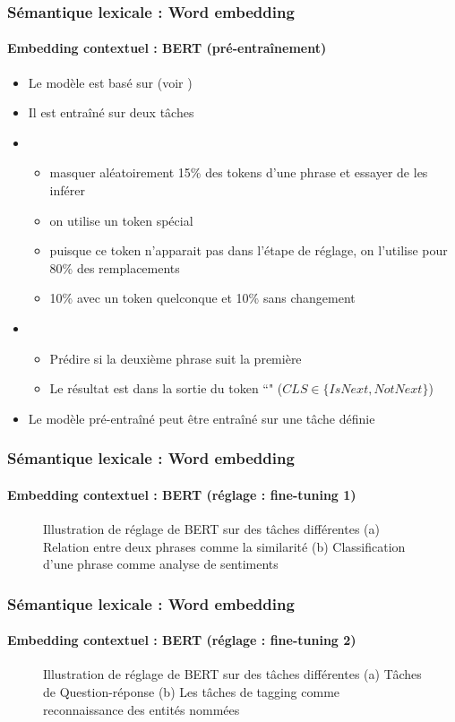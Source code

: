 \documentclass[xcolor=table]{beamer}
\begin{document}
\begin{frame}
\frametitle{Sémantique lexicale : Word embedding}
\framesubtitle{Embedding contextuel : BERT (pré-entraînement)}
	
\begin{itemize}
	\item Le modèle est basé sur  (voir \cite{2017-vaswani-al})
	\item Il est entraîné sur deux tâches
	\item {}
	\begin{itemize}
		\item masquer aléatoirement 15\% des tokens d'une phrase et essayer de les inférer
		\item on utilise un token spécial \keyword{[MASK]}
		\item puisque ce token n'apparait pas dans l'étape de réglage, on l'utilise pour 80\% des remplacements
		\item 10\% avec un token quelconque et 10\% sans changement 
	\end{itemize}
	\item {}
	\begin{itemize}
		\item Prédire si la deuxième phrase suit la première 
		\item Le résultat est dans la sortie du token ``\keyword{[CLS]}" ($CLS \in \{IsNext, NotNext\}$)
	\end{itemize}
	\item Le modèle pré-entraîné peut être entraîné sur une tâche définie
\end{itemize}
	
\end{frame}

\begin{frame}
\frametitle{Sémantique lexicale : Word embedding}
\framesubtitle{Embedding contextuel : BERT (réglage : fine-tuning 1)}

	\begin{figure}
		\caption{Illustration de réglage de BERT sur des tâches différentes \cite{2019-devlin-al}
		(a) Relation entre deux phrases comme la similarité (b) Classification d'une phrase comme analyse de sentiments
	}
	\end{figure}
	
\end{frame}

\begin{frame}
	\frametitle{Sémantique lexicale : Word embedding}
	\framesubtitle{Embedding contextuel : BERT (réglage : fine-tuning 2)}
	
	\begin{figure}
		\caption{Illustration de réglage de BERT sur des tâches différentes \cite{2019-devlin-al}
			(a) Tâches de Question-réponse (b) Les tâches de tagging comme reconnaissance des entités nommées
		}
	\end{figure}
	
\end{frame}
\end{document}
